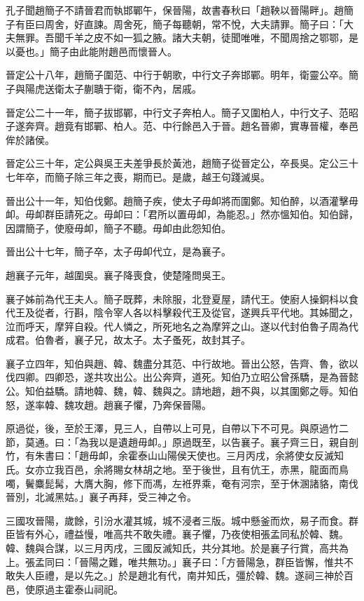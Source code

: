 \begin{pinyinscope}
孔子聞趙簡子不請晉君而執邯鄲午，保晉陽，故書春秋曰「趙鞅以晉陽畔」。趙簡子有臣曰周舍，好直諫。周舍死，簡子每聽朝，常不悅，大夫請罪。簡子曰：「大夫無罪。吾聞千羊之皮不如一狐之腋。諸大夫朝，徒聞唯唯，不聞周捨之鄂鄂，是以憂也。」簡子由此能附趙邑而懷晉人。

晉定公十八年，趙簡子圍范、中行于朝歌，中行文子奔邯鄲。明年，衛靈公卒。簡子與陽虎送衛太子蒯聵于衛，衛不內，居戚。

晉定公二十一年，簡子拔邯鄲，中行文子奔柏人。簡子又圍柏人，中行文子、范昭子遂奔齊。趙竟有邯鄲、柏人。范、中行餘邑入于晉。趙名晉卿，實專晉權，奉邑侔於諸侯。

晉定公三十年，定公與吳王夫差爭長於黃池，趙簡子從晉定公，卒長吳。定公三十七年卒，而簡子除三年之喪，期而已。是歲，越王句踐滅吳。

晉出公十一年，知伯伐鄭。趙簡子疾，使太子毋卹將而圍鄭。知伯醉，以酒灌擊毋卹。毋卹群臣請死之。毋卹曰：「君所以置毋卹，為能忍。」然亦慍知伯。知伯歸，因謂簡子，使廢毋卹，簡子不聽。毋卹由此怨知伯。

晉出公十七年，簡子卒，太子毋卹代立，是為襄子。

趙襄子元年，越圍吳。襄子降喪食，使楚隆問吳王。

襄子姊前為代王夫人。簡子既葬，未除服，北登夏屋，請代王。使廚人操銅枓以食代王及從者，行斟，陰令宰人各以枓擊殺代王及從官，遂興兵平代地。其姊聞之，泣而呼天，摩笄自殺。代人憐之，所死地名之為摩笄之山。遂以代封伯魯子周為代成君。伯魯者，襄子兄，故太子。太子蚤死，故封其子。

襄子立四年，知伯與趙、韓、魏盡分其范、中行故地。晉出公怒，告齊、魯，欲以伐四卿。四卿恐，遂共攻出公。出公奔齊，道死。知伯乃立昭公曾孫驕，是為晉懿公。知伯益驕。請地韓、魏，韓、魏與之。請地趙，趙不與，以其圍鄭之辱。知伯怒，遂率韓、魏攻趙。趙襄子懼，乃奔保晉陽。

原過從，後，至於王澤，見三人，自帶以上可見，自帶以下不可見。與原過竹二節，莫通。曰：「為我以是遺趙毋卹。」原過既至，以告襄子。襄子齊三日，親自剖竹，有朱書曰：「趙毋卹，余霍泰山山陽侯天使也。三月丙戌，余將使女反滅知氏。女亦立我百邑，余將賜女林胡之地。至于後世，且有伉王，赤黑，龍面而鳥噣，鬢麋髭髯，大膺大胸，修下而馮，左袵界乘，奄有河宗，至于休溷諸貉，南伐晉別，北滅黑姑。」襄子再拜，受三神之令。

三國攻晉陽，歲餘，引汾水灌其城，城不浸者三版。城中懸釜而炊，易子而食。群臣皆有外心，禮益慢，唯高共不敢失禮。襄子懼，乃夜使相張孟同私於韓、魏。韓、魏與合謀，以三月丙戌，三國反滅知氏，共分其地。於是襄子行賞，高共為上。張孟同曰：「晉陽之難，唯共無功。」襄子曰：「方晉陽急，群臣皆懈，惟共不敢失人臣禮，是以先之。」於是趙北有代，南并知氏，彊於韓、魏。遂祠三神於百邑，使原過主霍泰山祠祀。


\end{pinyinscope}
